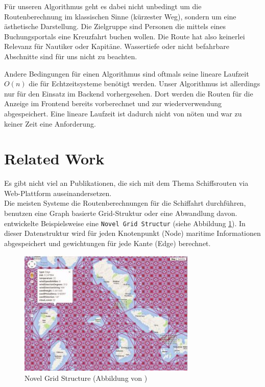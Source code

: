 \documentclass[letterpaper]{article}
\begin{document}
	Für unseren Algorithmus geht es dabei nicht unbedingt um die Routenberechnung im klassischen Sinne (kürzester Weg), sondern um eine ästhetische Darstellung. Die Zielgruppe sind Personen die mittels eines Buchungsportals eine Kreuzfahrt buchen wollen. Die Route hat also keinerlei Relevanz für Nautiker oder Kapitäne. Wassertiefe oder nicht befahrbare Abschnitte sind für uns nicht zu beachten. 

	Andere Bedingungen für einen Algorithmus sind oftmals seine lineare Laufzeit $O(n)$ die für Echtzeitsysteme benötigt werden. Unser Algorithmus ist allerdings nur für den Einsatz im Backend vorhergesehen. Dort werden die Routen für die Anzeige im Frontend bereits vorberechnet und zur wiederverwendung abgespeichert. Eine lineare Laufzeit ist dadurch nicht von nöten und war zu keiner Zeit eine Anforderung.

\section{Related Work}
	Es gibt nicht viel an Publikationen, die sich mit dem Thema Schiffsrouten via Web-Plattform auseinandersetzen.\\

	Die meisten Systeme die Routenberechnungen für die Schiffahrt durchführen, benutzen eine Graph basierte Grid-Struktur oder eine Abwandlung davon. \cite{makrygiorgos15} entwickelte Beispielsweise eine \texttt{Novel Grid Structur} (siehe Abbildung \ref{fig:novel grid structure}). In dieser Datenstruktur wird für jeden Knotenpunkt (Node) maritime Informationen abgespeichert und gewichtungen für jede Kante (Edge) berechnet.

	\begin{figure}[!htbp]
		\centering
		\includegraphics[width=.8\linewidth]{novel_grid_structure}
		\caption{Novel Grid Structure (Abbildung von \cite{makrygiorgos15})}
		\label{fig:novel grid structure}
	\end{figure}
\end{document}
